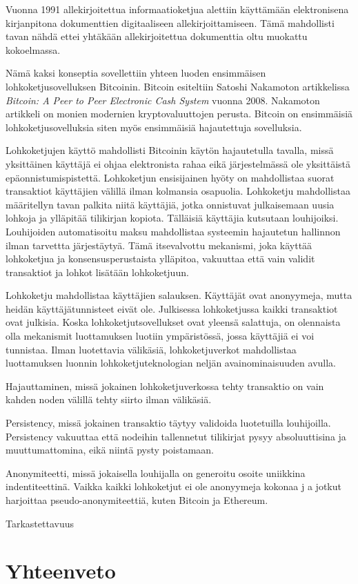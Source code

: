 \documentclass[utf8,bachelor]{gradu3}
\begin{document}
Vuonna 1991 allekirjoitettua informaatioketjua alettiin käyttämään elektronisena kirjanpitona dokumenttien digitaaliseen allekirjoittamiseen.
Tämä mahdollisti tavan nähdä ettei yhtäkään allekirjoitettua dokumenttia oltu muokattu kokoelmassa.

Nämä kaksi konseptia sovellettiin yhteen luoden ensimmäisen lohkoketjusovelluksen Bitcoinin. Bitcoin esiteltiin Satoshi Nakamoton artikkelissa \emph{Bitcoin: A Peer to Peer Electronic Cash System} \parencite{nakamoto2008bitcoin} vuonna 2008.
Nakamoton artikkeli on monien modernien kryptovaluuttojen perusta.
Bitcoin on ensimmäisiä lohkoketjusovelluksia siten myös ensimmäisiä hajautettuja sovelluksia.

Lohkoketjujen käyttö mahdollisti Bitcoinin käytön hajautetulla tavalla, missä yksittäinen käyttäjä ei ohjaa elektronista rahaa eikä järjestelmässä ole yksittäistä epäonnistumispistettä.
Lohkoketjun ensisijainen hyöty on mahdollistaa suorat transaktiot käyttäjien välillä ilman kolmansia osapuolia.
Lohkoketju mahdollistaa määritellyn tavan palkita niitä käyttäjiä, jotka onnistuvat julkaisemaan uusia lohkoja ja ylläpitää tilikirjan kopiota. Tälläisiä käyttäjia kutsutaan louhijoiksi.
Louhijoiden automatisoitu maksu mahdollistaa systeemin hajautetun hallinnon ilman tarvettta järjestäytyä.
Tämä itsevalvottu mekanismi, joka käyttää lohkoketjua ja konsensusperustaista ylläpitoa, vakuuttaa että vain validit transaktiot ja lohkot lisätään lohkoketjuun.

Lohkoketju mahdollistaa käyttäjien salauksen. 
Käyttäjät ovat anonyymeja, mutta heidän käyttäjätunnisteet eivät ole. Julkisessa lohkoketjussa kaikki transaktiot ovat julkisia. Koska lohkoketjutsovellukset ovat yleensä salattuja, on olennaista olla mekanismit luottamuksen luotiin ympäristössä, jossa käyttäjiä ei voi tunnistaa.
Ilman luotettavia välikäsiä, lohkoketjuverkot mahdollistaa luottamuksen luonnin lohkoketjuteknologian neljän avainominaisuuden avulla.
\parencite{yaga2019blockchain}

Hajauttaminen, missä jokainen lohkoketjuverkossa tehty transaktio on vain kahden noden välillä tehty siirto ilman välikäsiä.

Persistency, missä jokainen transaktio täytyy validoida luotetuilla louhijoilla. Persistency vakuuttaa että nodeihin tallennetut tilikirjat pysyy absoluuttisina ja muuttumattomina, eikä niintä pysty poistamaan.

Anonymiteetti, missä jokaisella louhijalla on generoitu osoite uniikkina indentiteettinä. Vaikka kaikki lohkoketjut ei ole anonyymeja kokonaa j a jotkut harjoittaa pseudo-anonymiteettiä, kuten Bitcoin ja Ethereum. 

Tarkastettavuus




\parencite{zarrin2021blockchain}






\chapter{Yhteenveto}


\printbibliography

\appendix
\end{document}
